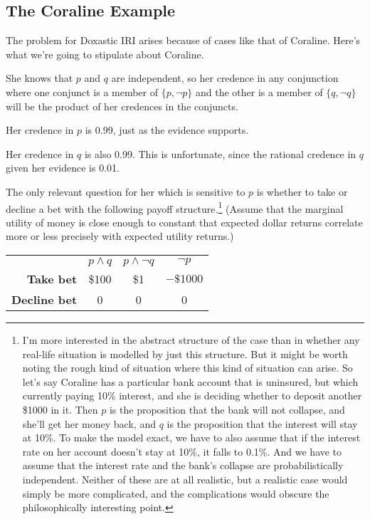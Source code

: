 \documentclass[11pt,oneside]{book}
\begin{document}
\subsection{The Coraline Example}
The problem for Doxastic IRI arises because of cases like that of Coraline. Here's what we're going to stipulate about Coraline.

\begin{itemize*}
\item She knows that $p$ and $q$ are independent, so her credence in any conjunction where one conjunct is a member of  $\{p,  \neg p\}$ and the other is a member of $\{q, \neg q\}$ will be the product of her credences in the conjuncts.
\item Her credence in $p$ is 0.99, just as the evidence supports.
\item Her credence in $q$ is also 0.99. This is unfortunate, since the rational credence in $q$ given her evidence is 0.01.
\item The only relevant question for her which is sensitive to $p$ is whether to take or decline a bet with the following payoff structure.\footnote{I'm more interested in the abstract structure of the case than in whether any real-life situation is modelled by just this structure. But it might be worth noting the rough kind of situation where this kind of situation can arise. So let's say Coraline has a particular bank account that is uninsured, but which currently paying 10\% interest, and she is deciding whether to deposit another \$1000 in it. Then $p$ is the proposition that the bank will not collapse, and she'll get her money back, and $q$ is the proposition that the interest will stay at 10\%. To make the model exact, we have to also assume that if the interest rate on her account doesn't stay at 10\%, it falls to 0.1\%. And we have to assume that the interest rate and the bank's collapse are probabilistically independent. Neither of these are at all realistic, but a realistic case would simply be more complicated, and the complications would obscure the philosophically interesting point.} (Assume that the marginal utility of money is close enough to constant that expected dollar returns correlate more or less precisely with expected utility returns.)
\end{itemize*}

\begin{center}
\begin{tabular}{r c c c}
 & \textbf{$p \wedge q$} & \textbf{$p \wedge \neg q$} & \textbf{$\neg p$} \\
\textbf{Take bet} & \$100 & \$1 & $-\$1000$ \\
\textbf{Decline bet} & 0 & 0 & 0 \\
\end{tabular}
\end{center}
\end{document}
